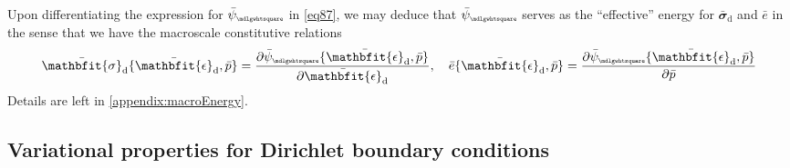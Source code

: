 \documentclass[12pt,a4paper]{article}
\renewcommand{\ts}[1]{\mathbfit{#1}}
\renewcommand{\Box}{\mdlgwhtsquare}
\renewcommand{\dev}{\mathrm{d}}
\newcommand{\rve}{
  {\mathchoice
   {\mbox{\scalebox{0.67}{$\Box$}}}
   {\mbox{\scalebox{0.67}{$\Box$}}}
   {\mbox{\scalebox{0.5}{$\Box$}}}
   {\mbox{\scalebox{0.375}{$\Box$}}}
  }
}
\begin{document}
Upon differentiating the expression for $\bar{\psi}_\rve$ in \cref{eq87}, we may deduce that $\bar{\psi}_\rve$ serves as the ``effective'' energy for $\bar{\ts\sigma}_\dev$ and $\bar{e}$ in the sense that we have the macroscale constitutive relations
\begin{equation}
    \bar{\ts\sigma}_\dev\{\bar{\ts\epsilon}_\dev,\bar{p}\} = \frac{\partial \bar{\psi}_\rve\{\bar{\ts\epsilon}_\dev,\bar{p}\}}{\partial \bar{\ts\epsilon}_\dev}, \quad
     \bar{e}\{\bar{\ts\epsilon}_\dev,\bar{p}\} = \frac{\partial \bar{\psi}_\rve\{\bar{\ts\epsilon}_\dev,\bar{p}\}}{\partial \bar{p}}
\label{eq88}
\end{equation}
Details are left in \cref{appendix:macroEnergy}.

\subsection{Variational properties for Dirichlet boundary conditions}
\end{document}
